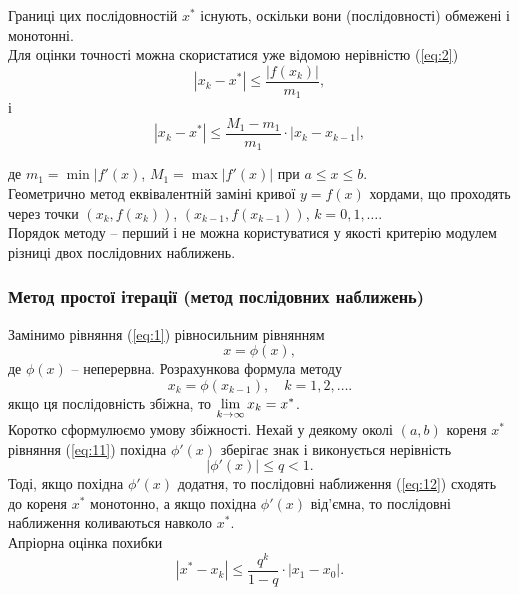 Границі цих послідовностій $x^*$ існують, оскільки вони (послідовності) обмежені і монотонні. \\

Для оцінки точності можна скористатися уже відомою нерівністю (\ref{eq:2})
\[ |x_k - x^*| \le \frac{|f(x_k)|}{m_1}, \]
і
\begin{equation}
	\label{eq:10}
	|x_k - x^*| \le \frac{M_1 - m_1}{m_1} \cdot |x_k - x_{k-1}|,
\end{equation}

де $m_1 = \min |f'(x)$, $M_1 = \max |f'(x)|$ при $a \le x \le b$. \\

Геометрично метод еквівалентній заміні кривої $y = f(x)$ хордами, що проходять через точки $(x_k, f(x_k))$, $(x_{k-1},f(x_{k-1}))$, $k = 0, 1, \ldots$. \\

Порядок методу -- перший і не можна користуватися у якості критерію модулем різниці двох послідовних наближень.

\subsubsection{Метод простої ітерації (метод послідовних наближень)}

Замінимо рівняння (\ref{eq:1}) рівносильним рівнянням
\begin{equation}
	\label{eq:11}
	x = \phi(x),
\end{equation}
де $\phi(x)$ -- неперервна. Розрахункова формула методу
\begin{equation}
	\label{eq:12}
	x_k = \phi(x_{k-1}), \quad k = 1, 2, \ldots .
\end{equation}
якщо ця послідовність збіжна, то $\displaystyle\lim\limits_{k \to \infty} x_k = x^*$. \\

Коротко сформулюємо умову збіжності. Нехай у деякому околі $(a, b)$ кореня $x^*$ рівняння (\ref{eq:11}) похідна $\phi'(x)$ зберігає знак і виконується нерівність
\begin{equation}
	\label{eq:13}
	|\phi'(x)| \le q < 1.
\end{equation}
Тоді, якщо похідна $\phi'(x)$ додатня, то послідовні наближення (\ref{eq:12}) сходять до кореня $x^*$ монотонно, а якщо похідна $\phi'(x)$ від'ємна, то послідовні наближення коливаються навколо $x^*$. \\

Апріорна оцінка похибки
\begin{equation}
	\label{eq:14}
	|x^* - x_k| \le \frac{q^k}{1 - q} \cdot |x_1 - x_0|. 
\end{equation}

